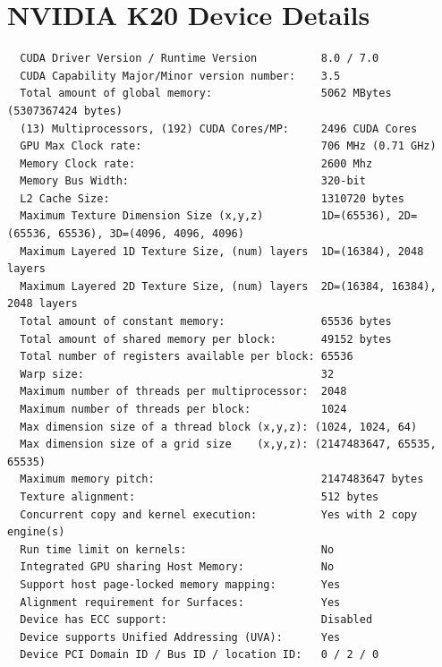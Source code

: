 \documentclass[12pt,a4paper]{report}
\begin{document}
\begin{table}
\caption{Cube memory capacity results}
\end{table}


\begin{table}
\caption{Cross memory capacity results. Diam here gives the diameter of the five constituent cubes of the cross.}
\end{table}

\chapter{NVIDIA K20 Device Details}
\begin{lstlisting}
  CUDA Driver Version / Runtime Version          8.0 / 7.0
  CUDA Capability Major/Minor version number:    3.5
  Total amount of global memory:                 5062 MBytes (5307367424 bytes)
  (13) Multiprocessors, (192) CUDA Cores/MP:     2496 CUDA Cores
  GPU Max Clock rate:                            706 MHz (0.71 GHz)
  Memory Clock rate:                             2600 Mhz
  Memory Bus Width:                              320-bit
  L2 Cache Size:                                 1310720 bytes
  Maximum Texture Dimension Size (x,y,z)         1D=(65536), 2D=(65536, 65536), 3D=(4096, 4096, 4096)
  Maximum Layered 1D Texture Size, (num) layers  1D=(16384), 2048 layers
  Maximum Layered 2D Texture Size, (num) layers  2D=(16384, 16384), 2048 layers
  Total amount of constant memory:               65536 bytes
  Total amount of shared memory per block:       49152 bytes
  Total number of registers available per block: 65536
  Warp size:                                     32
  Maximum number of threads per multiprocessor:  2048
  Maximum number of threads per block:           1024
  Max dimension size of a thread block (x,y,z): (1024, 1024, 64)
  Max dimension size of a grid size    (x,y,z): (2147483647, 65535, 65535)
  Maximum memory pitch:                          2147483647 bytes
  Texture alignment:                             512 bytes
  Concurrent copy and kernel execution:          Yes with 2 copy engine(s)
  Run time limit on kernels:                     No
  Integrated GPU sharing Host Memory:            No
  Support host page-locked memory mapping:       Yes
  Alignment requirement for Surfaces:            Yes
  Device has ECC support:                        Disabled
  Device supports Unified Addressing (UVA):      Yes
  Device PCI Domain ID / Bus ID / location ID:   0 / 2 / 0
\end{lstlisting}
\end{document}
